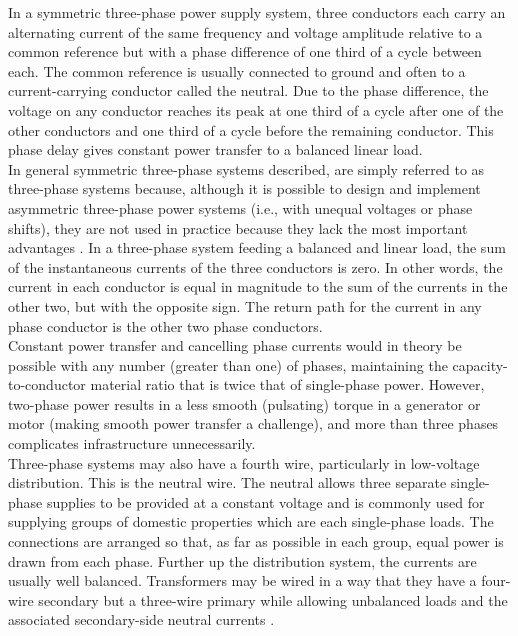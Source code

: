 In a symmetric three-phase power supply system, three conductors each carry an alternating current of the same frequency and voltage amplitude relative to a common reference but with a phase difference of one third of a cycle between each. The common reference is usually connected to ground and often to a current-carrying conductor called the neutral. Due to the phase difference, the voltage on any conductor reaches its peak at one third of a cycle after one of the other conductors and one third of a cycle before the remaining conductor. This phase delay gives constant power transfer to a balanced linear load.\\
In general symmetric three-phase systems described, are simply referred to as three-phase systems because, although it is possible to design and implement asymmetric three-phase power systems (i.e., with unequal voltages or phase shifts), they are not used in practice because they lack the most important advantages . In a three-phase system feeding a balanced and linear load, the sum of the instantaneous currents of the three conductors is zero. In other words, the current in each conductor is equal in magnitude to the sum of the currents in the other two, but with the opposite sign. The return path for the current in any phase conductor is the other two phase conductors.\\
Constant power transfer and cancelling phase currents would in theory be possible with any number (greater than one) of phases, maintaining the capacity-to-conductor material ratio that is twice that of single-phase power. However, two-phase power results in a less smooth (pulsating) torque in a generator or motor (making smooth power transfer a challenge), and more than three phases complicates infrastructure unnecessarily.\\
Three-phase systems may also have a fourth wire, particularly in low-voltage distribution. This is the neutral wire. The neutral allows three separate single-phase supplies to be provided at a constant voltage and is commonly used for supplying groups of domestic properties which are each single-phase loads. The connections are arranged so that, as far as possible in each group, equal power is drawn from each phase. Further up the distribution system, the currents are usually well balanced. Transformers may be wired in a way that they have a four-wire secondary but a three-wire primary while allowing unbalanced loads and the associated secondary-side neutral currents \cite{von2006electric}.\\
